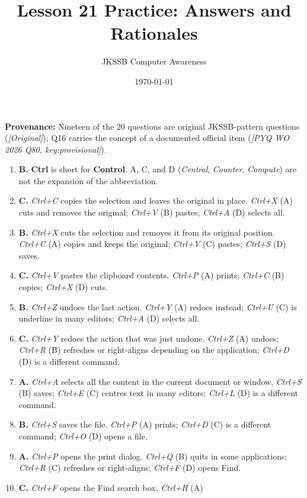 \documentclass[11pt]{article}
\title{Lesson 21 Practice: Answers and Rationales}
\author{JKSSB Computer Awareness}
\date{\today}
\begin{document}
\maketitle
\noindent\textbf{Provenance:} Nineteen of the 20 questions are original
JKSSB-pattern questions (\textit{[Original]}); Q16 carries the concept of a
documented official item (\textit{[PYQ WO 2026 Q80, key:provisional]}).
\begin{enumerate}[label=\textbf{Q\arabic*.}, leftmargin=*]
\item \textbf{B.} \textbf{Ctrl} is short for \textbf{Control}. A, C, and D
  (\textit{Central}, \textit{Counter}, \textit{Compute}) are not the expansion
  of the abbreviation.
\item \textbf{C.} \textit{Ctrl+C} copies the selection and leaves the original
  in place. \textit{Ctrl+X} (A) cuts and removes the original; \textit{Ctrl+V}
  (B) pastes; \textit{Ctrl+A} (D) selects all.
\item \textbf{B.} \textit{Ctrl+X} cuts the selection and removes it from its
  original position. \textit{Ctrl+C} (A) copies and keeps the original;
  \textit{Ctrl+V} (C) pastes; \textit{Ctrl+S} (D) saves.
\item \textbf{C.} \textit{Ctrl+V} pastes the clipboard contents. \textit{Ctrl+P}
  (A) prints; \textit{Ctrl+C} (B) copies; \textit{Ctrl+X} (D) cuts.
\item \textbf{B.} \textit{Ctrl+Z} undoes the last action. \textit{Ctrl+Y} (A)
  redoes instead; \textit{Ctrl+U} (C) is underline in many editors; \textit{Ctrl+A}
  (D) selects all.
\item \textbf{C.} \textit{Ctrl+Y} redoes the action that was just undone.
  \textit{Ctrl+Z} (A) undoes; \textit{Ctrl+R} (B) refreshes or right-aligns
  depending on the application; \textit{Ctrl+D} (D) is a different command.
\item \textbf{A.} \textit{Ctrl+A} selects all the content in the current
  document or window. \textit{Ctrl+S} (B) saves; \textit{Ctrl+E} (C) centres
  text in many editors; \textit{Ctrl+L} (D) is a different command.
\item \textbf{B.} \textit{Ctrl+S} saves the file. \textit{Ctrl+P} (A) prints;
  \textit{Ctrl+D} (C) is a different command; \textit{Ctrl+O} (D) opens a file.
\item \textbf{A.} \textit{Ctrl+P} opens the print dialog. \textit{Ctrl+Q} (B)
  quits in some applications; \textit{Ctrl+R} (C) refreshes or right-aligns;
  \textit{Ctrl+F} (D) opens Find.
\item \textbf{C.} \textit{Ctrl+F} opens the Find search box. \textit{Ctrl+H} (A)

\end{enumerate}
\end{document}
